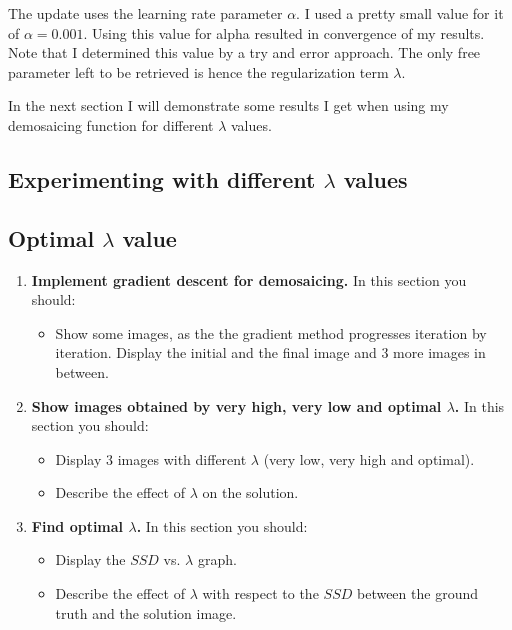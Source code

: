 \documentclass{paper}
\begin{document}
The update uses the learning rate parameter $\alpha$. I used a pretty small value for it of $\alpha=0.001$. Using this value for alpha resulted in convergence of my results. Note that I determined this value by a try and error approach. The only free parameter left to be retrieved is hence the regularization term $\lambda$.

In the next section I will demonstrate some results I get when using my demosaicing function for different $\lambda$ values. 

\subsection{Experimenting with different $\lambda$ values}
\subsection{Optimal $\lambda$ value}

\begin{enumerate}
\item \textbf{Implement gradient descent for demosaicing.} In this section you should:

\begin{itemize}
\item Show some images, as the the gradient method progresses iteration by iteration. Display the initial and the final image and 3 more images in between.
\end{itemize}

\item \textbf{Show images obtained by very high, very low and optimal $\lambda$.} In this section you should:

\begin{itemize}
\item Display 3 images with different $\lambda$ (very low, very high and optimal).
\item Describe the effect of $\lambda$ on the solution.
\end{itemize}

\item \textbf{ Find optimal $\lambda$.} In this section you should:

\begin{itemize}
\item Display the $SSD$ vs. $\lambda$ graph.
\item Describe the effect of $\lambda$ with respect to the $SSD$ between the ground truth and the solution image.
\end{itemize}


\end{enumerate}


 
\end{document}
